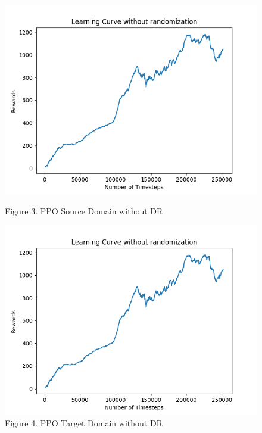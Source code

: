 \documentclass[12pt]{article}
\begin{document}
\begin{figure}[H]
    \vfill
    \begin{minipage}{0.45\textwidth}
        \centering
        \includegraphics[width=\textwidth]{../images/Learning_Curve_PPO_no_rand_Source.png}
        \caption{Figure 3. PPO Source Domain without DR}
        \label{fig:ppo_source_no_dr}
    \end{minipage}
    \hfill
    \begin{minipage}{0.45\textwidth}
        \centering
        \includegraphics[width=\textwidth]{../images/Learning_Curve_PPO_no_rand_Source.png}
        \caption{Figure 4. PPO Target Domain without DR}
        \label{fig:ppo_target_no_dr}
    \end{minipage}
\end{figure}
\end{document}
